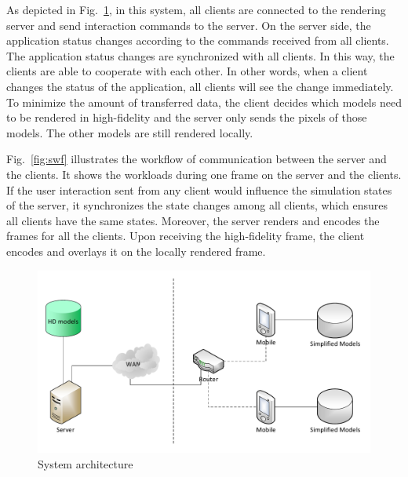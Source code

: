 As depicted in Fig.~\ref{fig:architecture}, in this system, all clients are connected to the rendering server and send interaction commands to the server.
On the server side, the application status changes according to the commands received from all clients. The application status changes are synchronized with all clients. In this way, the clients are able to cooperate with each other. In other words, when a client changes the status of the application, all clients will see the change immediately.
To minimize the amount of transferred data, the client decides which models need to be rendered in high-fidelity and the server only sends the pixels of those models. The other models are still rendered locally.

Fig.~\ref{fig:swf} illustrates the workflow of communication between the server and the clients. It shows the workloads during one frame on the server and the clients. If the user interaction sent from any client would influence the simulation states of the server, it synchronizes the state changes among all clients, which ensures all clients have the same states. Moreover, the server renders and encodes the frames for all the clients. Upon receiving the high-fidelity frame, the client encodes and overlays it on the locally rendered frame.

\begin{figure}[!htbp]
	\centering
	\includegraphics[width=\columnwidth]{figures/architecture.pdf}
	\caption{System architecture}
	\label{fig:architecture}
\end{figure}

